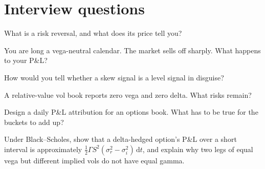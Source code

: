\section{Interview questions}

\begin{interviewq}\label{iq:s2:skew-and-term-structure-relative-value:1}
What is a risk reversal, and what does its price tell you?
\end{interviewq}

\begin{interviewq}\label{iq:s2:skew-and-term-structure-relative-value:2}
You are long a vega-neutral calendar. The market sells off sharply. What happens to your P\&L?
\end{interviewq}

\begin{interviewq}\label{iq:s2:skew-and-term-structure-relative-value:3}
How would you tell whether a skew signal is a level signal in disguise?
\end{interviewq}

\begin{interviewq}\label{iq:s2:skew-and-term-structure-relative-value:4}
A relative-value vol book reports zero vega and zero delta. What risks remain?
\end{interviewq}

\begin{interviewq}\label{iq:s2:skew-and-term-structure-relative-value:5}
Design a daily P\&L attribution for an options book. What has to be true for the buckets to add up?
\end{interviewq}

\begin{interviewq}\label{iq:s2:skew-and-term-structure-relative-value:6}
Under Black--Scholes, show that a delta-hedged option's P\&L over a short interval is approximately $\tfrac12\Gamma S^2(\sigma_r^2 -
\sigma_i^2)\,\mathrm{d}t$, and explain why two legs of equal vega but different implied vols do not have equal gamma.
\end{interviewq}
